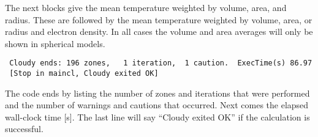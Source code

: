 The next blocks give the mean temperature weighted by volume, area, and radius.
These are followed by the mean temperature weighted by volume, area, or radius and
electron density. In all cases the volume and area averages will only be shown in
spherical models.
{\setverbatimfontsize{\tiny}
\begin{verbatim}
 Cloudy ends: 196 zones,   1 iteration,  1 caution.  ExecTime(s) 86.97
 [Stop in maincl, Cloudy exited OK]
\end{verbatim}
}

The code ends by listing the number of zones and iterations that were
performed and the number of warnings and cautions that occurred.
Next comes
the elapsed wall-clock time [s].
The last line will say ``Cloudy exited
OK'' if the calculation is successful.

